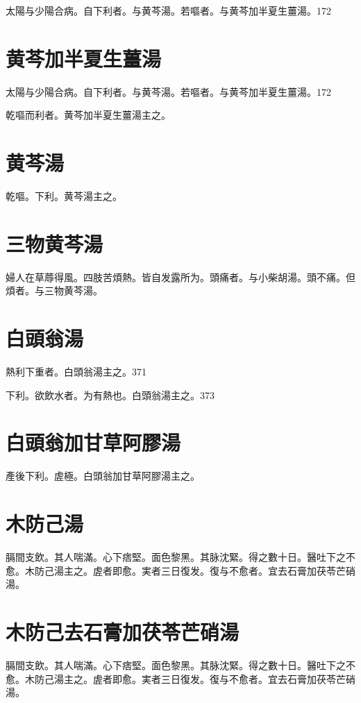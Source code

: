 \documentclass[12pt,twoside,UTF8,b5paper]{ctexbook}
\begin{document}
太陽与少陽合病。自下利者。与黄芩湯。若嘔者。与黄芩加半夏生薑湯。172

\section{黄芩加半夏生薑湯}

太陽与少陽合病。自下利者。与黄芩湯。若嘔者。与黄芩加半夏生薑湯。172

乾嘔而利者。黄芩加半夏生薑湯主之。

\section{黄芩湯}

乾嘔。下利。黄芩湯主之。

\section{三物黄芩湯}

婦人在草蓐得風。四肢苦煩熱。皆自发露所为。頭痛者。与小柴胡湯。頭不痛。但煩者。与三物黄芩湯。

\section{白頭翁湯}

熱利下重者。白頭翁湯主之。371

下利。欲飲水者。为有熱也。白頭翁湯主之。373

\section{白頭翁加甘草阿膠湯}

產後下利。虗極。白頭翁加甘草阿膠湯主之。

\section{木防己湯}

膈間支飲。其人喘滿。心下痞堅。面色黎黑。其脉沈緊。得之數十日。醫吐下之不愈。木防己湯主之。虗者即愈。実者三日復发。復与不愈者。宜去石膏加茯苓芒硝湯。

\section{木防己去石膏加茯苓芒硝湯}

膈間支飲。其人喘滿。心下痞堅。面色黎黑。其脉沈緊。得之數十日。醫吐下之不愈。木防己湯主之。虗者即愈。実者三日復发。復与不愈者。宜去石膏加茯苓芒硝湯。
\end{document}
